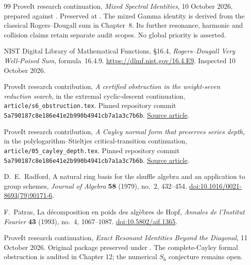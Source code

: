 \begin{thebibliography}{99}
ProveIt research continuation,
\emph{Mixed Spectral Identities}, 10 October 2026,
prepared against .
Preserved at .
The mixed Gamma identity is derived from the classical Rogers--Dougall sum
in Chapter~8. Its further resonance, harmonic and collision claims retain
separate audit scopes. No global priority is asserted.

NIST Digital Library of Mathematical Functions, \S16.4,
\emph{Rogers--Dougall Very Well-Poised Sum}, formula~16.4.9.
\url{https://dlmf.nist.gov/16.4.E9}. Inspected 10 October 2026.

ProveIt research contribution,
\emph{A certified obstruction in the weight-seven reduction search},
in the extremal cyclic-descent continuation,
\texttt{article/s6\_obstruction.tex}.
Pinned repository commit
\texttt{5a790187c8e186e41e2b990b4941cb7a1a3c7b6b}.
\href{https://github.com/VladimirReshetnikov/ProveIt/blob/5a790187c8e186e41e2b990b4941cb7a1a3c7b6b/Analysis/Polylogarithms/docs/reports/formal-reductions-continuation/continuations/extremal-cyclic-descent/article/s6_obstruction.tex}{Source article}.

ProveIt research contribution,
\emph{A Cayley normal form that preserves series depth},
in the polylogarithm--Stieltjes critical-transition continuation,
\texttt{article/05\_cayley\_depth.tex}.
Pinned repository commit
\texttt{5a790187c8e186e41e2b990b4941cb7a1a3c7b6b}.
\href{https://github.com/VladimirReshetnikov/ProveIt/blob/5a790187c8e186e41e2b990b4941cb7a1a3c7b6b/Analysis/Polylogarithms/docs/reports/uniform-transition-continuation/continuations/polylog-stieltjes-critical-transition/article/05_cayley_depth.tex}{Source article}.

D.~E.~Radford,
A natural ring basis for the shuffle algebra and an application to group
schemes, \emph{Journal of Algebra} \textbf{58} (1979), no.~2, 432--454.
\href{https://doi.org/10.1016/0021-8693(79)90171-6}{doi:10.1016/0021-8693(79)90171-6}.

F.~Patras,
La d\'ecomposition en poids des alg\`ebres de Hopf,
\emph{Annales de l'Institut Fourier} \textbf{43} (1993), no.~4, 1067--1087.
\href{https://doi.org/10.5802/aif.1365}{doi:10.5802/aif.1365}.


ProveIt research continuation, \emph{Exact Resonant Identities Beyond the Diagonal}, 11 October 2026. Original package preserved under . The complete-Cayley formal obstruction is audited in Chapter 12; the numerical $S_6$ conjecture remains open.


\end{thebibliography}
